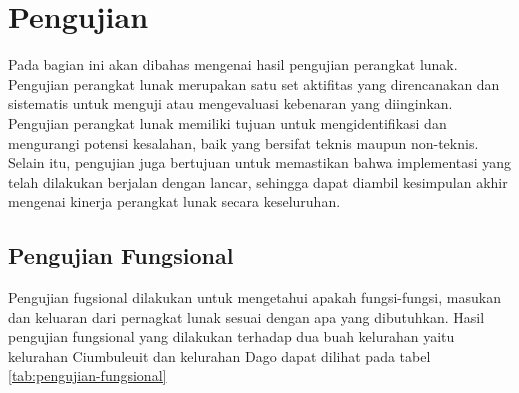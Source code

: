 \section{Pengujian}
\label{sec:pengujian}
Pada bagian ini akan dibahas mengenai hasil pengujian perangkat lunak. Pengujian perangkat lunak merupakan satu set aktifitas yang direncanakan dan sistematis untuk menguji atau mengevaluasi kebenaran yang diinginkan\cite{rosa:11:pengujian}. Pengujian perangkat lunak memiliki tujuan untuk mengidentifikasi dan mengurangi potensi kesalahan, baik yang bersifat teknis maupun non-teknis. Selain itu, pengujian juga bertujuan untuk memastikan bahwa implementasi yang telah dilakukan berjalan dengan lancar, sehingga dapat diambil kesimpulan akhir mengenai kinerja perangkat lunak secara keseluruhan.

\subsection{Pengujian Fungsional}
Pengujian fugsional dilakukan untuk mengetahui apakah fungsi-fungsi, masukan dan keluaran dari pernagkat lunak sesuai dengan apa yang dibutuhkan. Hasil pengujian fungsional yang dilakukan terhadap dua buah kelurahan yaitu kelurahan Ciumbuleuit dan kelurahan Dago dapat dilihat pada tabel \ref{tab:pengujian-fungsional}
